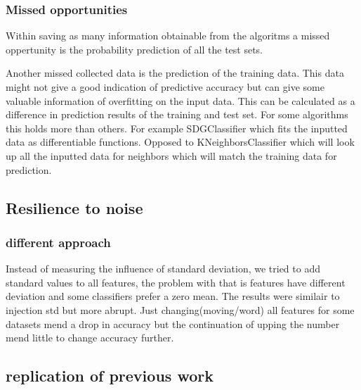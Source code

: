 \documentclass[a4paper,10pt]{article}
\begin{document}
\subsubsection{Missed opportunities}
Within saving as many information obtainable from the algoritms a missed oppertunity is the probability prediction of all the test sets. 

Another missed collected data is the prediction of the training data. This data might not give a good indication of predictive accuracy but can give some valuable information of overfitting on the input data. This can be calculated as a difference in prediction results of the training and test set. For some algorithms this holds more than others. For example SDGClassifier which fits the inputted data as differentiable functions. Opposed to KNeighborsClassifier which will look up all the inputted data for neighbors which will match the training data for prediction. 

\subsection{Resilience to noise}






\subsubsection{different approach}
Instead of measuring the influence of standard deviation, we tried to add standard values to all features, the problem with that is features have different deviation and some classifiers prefer a zero mean. The results were similair to injection std but more abrupt. Just changing(moving/word) all features for some datasets mend a drop in accuracy but the continuation of upping the number mend little to change accuracy further.




\subsection{replication of previous work}
\end{document}
